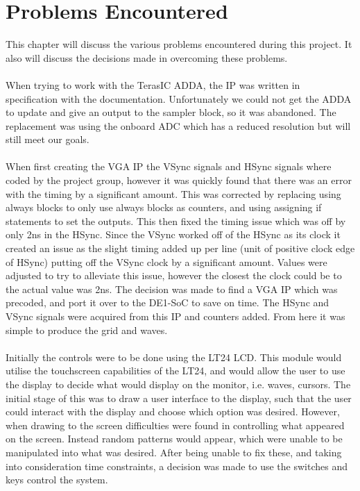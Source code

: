 \documentclass[a4paper,12pt]{article}
\begin{document}
\section{Problems Encountered}
\begin{flushleft}
This chapter will discuss the various problems encountered during this project. It also will discuss the decisions made in overcoming these problems. 
\\ \- \\
When trying to work with the TerasIC ADDA, the IP was written in specification with the documentation. Unfortunately we could not get the ADDA to update and give an output to the sampler block, so it was abandoned. The replacement was using the onboard ADC which has a reduced resolution but will still meet our goals. 
\\ \- \\
When first creating the VGA IP the VSync signals and HSync signals where coded by the project group, however it was quickly found that there was an error with the timing by a significant amount. This was corrected by replacing using always blocks to only use always blocks as counters, and using assigning if statements to set the outputs. This then fixed the timing issue which was off by only 2ns in the HSync. Since the VSync worked off of the HSync as its clock it created an issue as the slight timing added up per line (unit of positive clock edge of HSync) putting off the VSync clock by a significant amount. Values were adjusted to try to alleviate this issue, however the closest the clock could be to the actual value was 2ns. The decision was made to find a VGA IP which was precoded, and port it over to the DE1-SoC to save on time. The HSync and VSync signals were acquired from this IP and counters added.\cite{stump_2012} From here it was simple to produce the grid and waves.
\\ \- \\
Initially the controls were to be done using the LT24 LCD. This module would utilise the touchscreen capabilities of the LT24, and would allow the user to use the display to decide what would display on the monitor, i.e. waves, cursors. The initial stage of this was to draw a user interface to the display, such that the user could interact with the display and choose which option was desired. However, when drawing to the screen difficulties were found in controlling what appeared on the screen. Instead random patterns would appear, which were unable to be manipulated into what was desired. After being unable to fix these, and taking into consideration time constraints, a decision was made to use the switches and keys control the system. 
\end{flushleft}
\newpage
\end{document}

